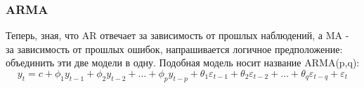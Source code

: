 







\subsubsection{ARMA}

Теперь, зная, что AR отвечает за зависимость от прошлых наблюдений, а 
MA - за зависимость от прошлых ошибок, напрашивается логичное предположение: 
объединить эти две модели в одну. Подобная модель носит название ARMA(p,q):
\begin{equation*}
    y_t = c + 
    \phi_1 y_{t-1} + \phi_2 y_{t-2} + \dots + \phi_p y_{t-p} + 
    \theta_1 \varepsilon_{t-1} + \theta_2 \varepsilon_{t-2} + \dots + \theta_q \varepsilon_{t-q} + 
    \varepsilon_t
\end{equation*}

